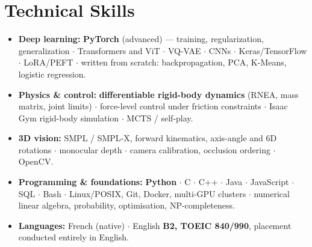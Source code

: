 \documentclass[10pt, letterpaper]{article}
\begin{document}
\section{Technical Skills}
\begin{itemize}
    \item \textbf{Deep learning:} \textbf{PyTorch} (advanced) --- training, regularization, generalization $\cdot$ Transformers and ViT $\cdot$ VQ-VAE $\cdot$ CNNs $\cdot$ Keras/TensorFlow $\cdot$ LoRA/PEFT $\cdot$ written from scratch: backpropagation, PCA, K-Means, logistic regression.
    \item \textbf{Physics \& control:} \textbf{differentiable rigid-body dynamics} (RNEA, mass matrix, joint limits) $\cdot$ force-level control under friction constraints $\cdot$ Isaac Gym rigid-body simulation $\cdot$ MCTS / self-play.
    \item \textbf{3D vision:} SMPL / SMPL-X, forward kinematics, axis-angle and 6D rotations $\cdot$ monocular depth $\cdot$ camera calibration, occlusion ordering $\cdot$ OpenCV.
    \item \textbf{Programming \& foundations:} \textbf{Python} $\cdot$ C $\cdot$ C++ $\cdot$ Java $\cdot$ JavaScript $\cdot$ SQL $\cdot$ Bash $\cdot$ Linux/POSIX, Git, Docker, multi-GPU clusters $\cdot$ numerical linear algebra, probability, optimisation, NP-completeness.
    \item \textbf{Languages:} French (native) $\cdot$ English \textbf{B2, TOEIC 840/990}, placement conducted entirely in English.
\end{itemize}
\end{document}
